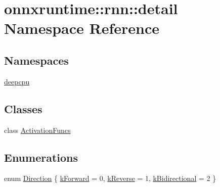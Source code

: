 \hypertarget{namespaceonnxruntime_1_1rnn_1_1detail}{}\section{onnxruntime\+:\+:rnn\+:\+:detail Namespace Reference}
\label{namespaceonnxruntime_1_1rnn_1_1detail}
\subsection*{Namespaces}
\begin{DoxyCompactItemize}
\item 
 \mbox{\hyperlink{namespaceonnxruntime_1_1rnn_1_1detail_1_1deepcpu}{deepcpu}}
\end{DoxyCompactItemize}
\subsection*{Classes}
\begin{DoxyCompactItemize}
\item 
class \mbox{\hyperlink{classonnxruntime_1_1rnn_1_1detail_1_1ActivationFuncs}{Activation\+Funcs}}
\end{DoxyCompactItemize}
\subsection*{Enumerations}
\begin{DoxyCompactItemize}
\item 
enum \mbox{\hyperlink{namespaceonnxruntime_1_1rnn_1_1detail_a3a4cfb298df0a68436cdb8879647de1d}{Direction}} \{ \mbox{\hyperlink{namespaceonnxruntime_1_1rnn_1_1detail_a3a4cfb298df0a68436cdb8879647de1da471a88784f9f00143e0dc6b1dc9b3ea6}{k\+Forward}} = 0, 
\mbox{\hyperlink{namespaceonnxruntime_1_1rnn_1_1detail_a3a4cfb298df0a68436cdb8879647de1daeca0897567745c83184be011cc29f973}{k\+Reverse}} = 1, 
\mbox{\hyperlink{namespaceonnxruntime_1_1rnn_1_1detail_a3a4cfb298df0a68436cdb8879647de1da6d211d65b351fc4d9158892efc168bf3}{k\+Bidirectional}} = 2
 \}
\end{DoxyCompactItemize}
